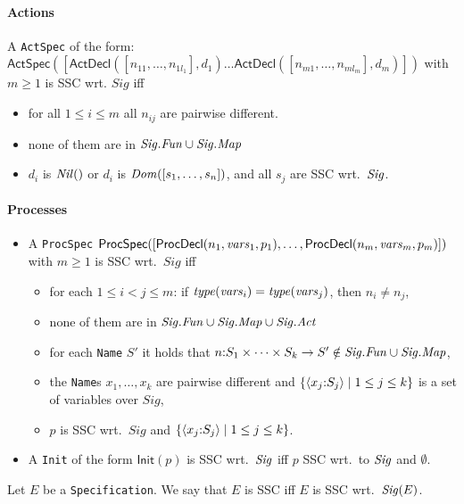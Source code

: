 \documentclass[fleqn,a4paper,dvips]{article}
\newcommand{\aterm}[1]{\mathsf{#1}}
\newcommand{\Sig}{\nm{Sig}}
\newcommand{\Fun}{\nm{Fun}}
\begin{document}
\paragraph{Actions}
  A {\tt ActSpec} of the form:\\
$\aterm{ActSpec}([\aterm{ActDecl}([n_{11},\dots,n_{1l_1}],d_1)\dots\aterm{ActDecl}([n_{m1},\dots,n_{ml_m}],d_m)])$
with $m\geq 1$ is SSC wrt. $Sig$ iff
\begin{itemize}
\item for all $1\leq i\leq m$ all $n_{ij}$ are pairwise different.
\item none of them are in $\Sig.\Fun\cup\Sig.\Map$
\item $d_i$ is $\mathit{Nil}()$ or $d_i$ is $\mathit{Dom}([s_1,\dots,s_n])$, and all $s_j$ are SSC wrt.\ $\Sig$.
\end{itemize}

\paragraph{Processes}
\begin{itemize}
\item
  A {\tt ProcSpec}
  $\aterm{ProcSpec}([\aterm{ProcDecl}(n_1,\nm{vars}_1,p_1),\dots,\aterm{ProcDecl}(n_m,\nm{vars}_m,p_m)])$
  with $m\geq 1$ is SSC wrt.\ $Sig$ iff
  \begin{itemize}
  \item
    for each $1\leq i<j\leq m$:
    if $\mathit{type}(\mathit{vars}_i)=\mathit{type}(\mathit{vars}_j)$, then $n_i\neq n_j$,
  \item none of them are in $\Sig.\Fun\cup\Sig.\Map\cup\Sig.\Act$
  \item
    for each {\tt Name} $S'$ it holds that $n\ap S_{1}\times\cdots\times
    S_{k}\rightarrow S'\notin \Sig.\Fun\cup\Sig.\Map$,
  \item the {\tt Name}s $x_{1},\ldots,x_{k}$ are pairwise different
    and $\{\langle x_{j}{:} S_{j}\rangle\mid 1\leq j\leq k\}$ is a set
    of variables over $Sig$,
  \item $p$ is SSC wrt.\ $Sig$ and $\{\langle
    x_{j}{:} S_{j}\rangle\mid 1\leq j\leq k\}$.
  \end{itemize}
\item
  A {\tt Init} of the form $\aterm{Init}(p)$ is SSC wrt.\ $\Sig$
  iff $p$ SSC wrt.\ to $\Sig$ and $\emptyset$.
\end{itemize}

\begin{defn}\label{def:SSC-mCRL}
  Let $E$ be a {\tt Specification}. We say that $E$ is SSC iff $E$ is SSC
  wrt.\ $\Sig(E)$.
\end{defn}
\end{document}

